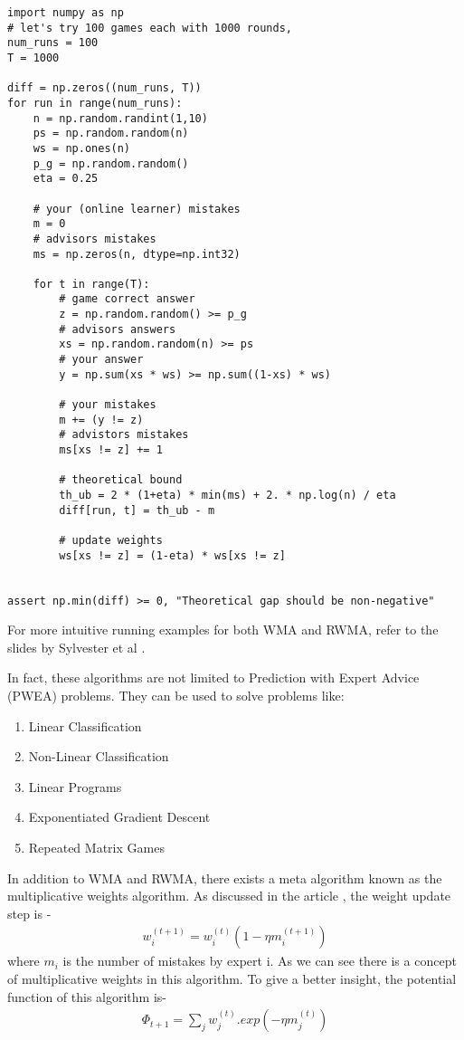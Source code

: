 \documentclass[11pt]{article}
\begin{document}
\begin{lstlisting}
import numpy as np
# let's try 100 games each with 1000 rounds,  
num_runs = 100
T = 1000

diff = np.zeros((num_runs, T))
for run in range(num_runs):
    n = np.random.randint(1,10)
    ps = np.random.random(n)
    ws = np.ones(n)
    p_g = np.random.random()
    eta = 0.25

    # your (online learner) mistakes
    m = 0
    # advisors mistakes
    ms = np.zeros(n, dtype=np.int32)

    for t in range(T):
        # game correct answer
        z = np.random.random() >= p_g
        # advisors answers
        xs = np.random.random(n) >= ps
        # your answer
        y = np.sum(xs * ws) >= np.sum((1-xs) * ws)

        # your mistakes
        m += (y != z)
        # advistors mistakes
        ms[xs != z] += 1

        # theoretical bound
        th_ub = 2 * (1+eta) * min(ms) + 2. * np.log(n) / eta
        diff[run, t] = th_ub - m
        
        # update weights
        ws[xs != z] = (1-eta) * ws[xs != z]


assert np.min(diff) >= 0, "Theoretical gap should be non-negative"
\end{lstlisting}


For more intuitive running examples for both WMA and RWMA, refer to the slides by Sylvester et al \cite{pdf}.

In fact, these algorithms are not limited to Prediction with Expert Advice (PWEA) problems. They can be used to solve problems like:
\begin{enumerate}
    \item Linear Classification
    \item Non-Linear Classification
    \item Linear Programs
    \item Exponentiated Gradient Descent
    \item Repeated Matrix Games
\end{enumerate}





In addition to WMA and RWMA, there exists a meta algorithm known as the multiplicative weights algorithm. As discussed in the article \cite{MWA}, the weight update step is -
\begin{align*}
    w_i^{(t+1)}=w_i^{(t)}(1-\eta m_i^{(t+1)})
\end{align*}
where $m_i$ is the number of mistakes by expert i. As we can see there is a concept of multiplicative weights in this algorithm. To give a better insight, the potential function of this algorithm is-
\begin{align*}
    \Phi_{t+1}=\sum_j w_j^{(t)}.exp(-\eta m_j^{(t)})
\end{align*}
\\
\end{document}
